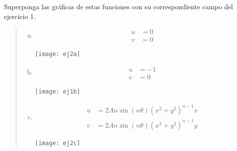 \documentclass[a4paper,10pt,twoside,final,spanish]{article}
\begin{document}
Superponga las gráficas de estas funciones con su correspondiente campo del ejercicio 1.

\dotfill

\begin{quote}
\begin{enumerate}[a)]

\item

\begin{minipage}{0.5\linewidth}

\begin{align*}
u &= 0 \\
v &= 0
\end{align*}

\end{minipage} \hfill \begin{minipage}{0.5\linewidth}

\texttt{[image: ej2a]}

\end{minipage}

\item

\begin{minipage}{0.5\linewidth}

\begin{align*}
u &= -1 \\
v &= 0
\end{align*}

\end{minipage} \hfill \begin{minipage}{0.5\linewidth}

\texttt{[image: ej1b]}

\end{minipage}

\item

\begin{minipage}{0.5\linewidth}

\begin{align*}
u &= 2An\sin{(n\theta)}(x^{2}+y^{2})^{n-1}x \\
v &= 2An\sin{(n\theta)}(x^{2}+y^{2})^{n-1}y
\end{align*}

\end{minipage} \hfill \begin{minipage}{0.5\linewidth}

\texttt{[image: ej2c]}

\end{minipage}


\end{enumerate}
\end{quote}
\end{document}
